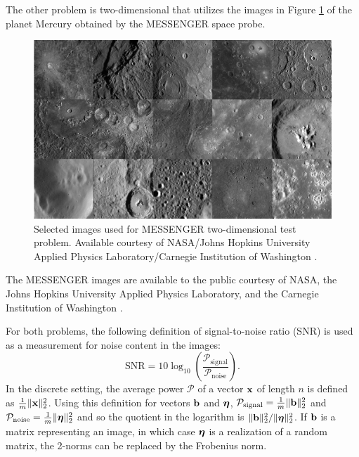 \documentclass[12pt]{article}
\begin{document}
\noindent The other problem is two-dimensional that utilizes the images in Figure \ref{fig:MESSENGER True} of the planet Mercury obtained by the MESSENGER space probe. 

\begin{figure}[ht]
\includegraphics[width=1.0\textwidth]{Figures/MESSENGER.pdf}
\caption{Selected images used for MESSENGER two-dimensional test problem. Available courtesy of NASA/Johns  Hopkins  University  Applied  Physics  Laboratory/Carnegie Institution of Washington \cite{MESSENGER}.}
\label{fig:MESSENGER True}
\end{figure}

\noindent The MESSENGER images are available to the public courtesy of NASA, the Johns Hopkins University Applied Physics Laboratory, and the Carnegie Institution of Washington \cite{MESSENGER}. \par
For both problems, the following definition of signal-to-noise ratio (SNR) is used as a measurement for noise content in the images:
\begin{equation}
\label{eq:SNR}
\text{SNR} = 10\log_{10}\left(\frac{\mathcal{P}_{\text{signal}}}{\mathcal{P}_{\text{noise}}}\right).
\end{equation}
In the discrete setting, the average power $\mathcal{P}$ of a vector $\mathbf{x}$ of length $n$ is defined as $\frac{1}{m}\|\mathbf{x}\|^2_2$. Using this definition for vectors $\mathbf{b}$ and $\bm{\eta}$, $\mathcal{P}_{\text{signal}} = \frac{1}{m}\|\mathbf{b}\|^2_2$ and $\mathcal{P}_{\text{noise}} = \frac{1}{m}\|\bm{\eta}\|^2_2$ and so the quotient in the logarithm is $\|\mathbf{b}\|_2^2/\|\bm{\eta}\|_2^2$. If $\mathbf{b}$ is a matrix representing an image, in which case $\bm{\eta}$ is a realization of a random matrix, the 2-norms can be replaced by the Frobenius norm.
\end{document}
